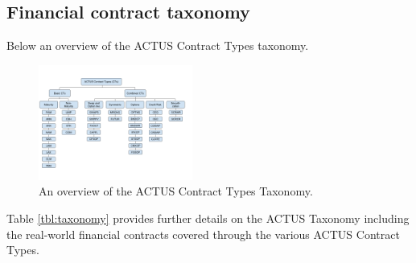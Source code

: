 \documentclass[9pt,oneside]{amsart}
\begin{document}
\begin{multicols}{2}

\section{Financial contract taxonomy}\label{sec:taxonomy}

Below an overview of the ACTUS Contract Types taxonomy.


\begin{figure}[H]
	\centering
	\includegraphics[width=0.45\textwidth]{./media/taxonomy.png}
	\caption{An overview of the ACTUS Contract Types Taxonomy.}
	\label{fig:taxonomy}
\end{figure}


Table \ref{tbl:taxonomy} provides further details on the ACTUS Taxonomy including the real-world financial contracts covered through the various ACTUS Contract Types.



\end{multicols}
\end{document}
